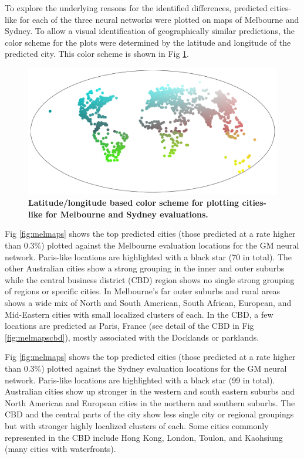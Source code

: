 \documentclass[10pt,letterpaper]{article}
\begin{document}
To explore the underlying reasons for the identified differences, predicted cities-like for each of the three neural networks were plotted on maps of Melbourne and Sydney. To allow a visual identification of geographically similar predictions, the color scheme for the plots were determined by the latitude and longitude of the predicted city. This color scheme is shown in Fig \ref{fig:colorscheme}. 


\begin{figure}[!htbp]
\centering    
\includegraphics[scale=0.25]{Images/World_map_color_scheme.png} 
\caption{\bf Latitude/longitude based color scheme for plotting cities-like for Melbourne and Sydney evaluations.}    
 \label{fig:colorscheme}  
\end{figure} 


Fig \ref{fig:melmaps} shows the top predicted cities (those predicted at a rate higher than 0.3\%) plotted against the Melbourne evaluation locations for the GM neural network. Paris-like locations are highlighted with a black star (70 in total). The other Australian cities show a strong grouping in the inner and outer suburbs while the central business district (CBD) region shows no single strong grouping of regions or specific cities. In Melbourne's far outer suburbs and rural areas shows a wide mix of North and South American, South African, European, and Mid-Eastern cities with small localized clusters of each. In the CBD, a few locations are predicted as Paris, France (see detail of the CBD in Fig \ref{fig:melmapscbd}), mostly associated with the Docklands or parklands.

Fig \ref{fig:melmaps} shows the top predicted cities (those predicted at a rate higher than 0.3\%) plotted against the Sydney evaluation locations for the GM neural network. Paris-like locations are highlighted with a black star (99 in total).  Australian cities show up stronger in the western and south eastern suburbs and North American and European cities in the northern and southern suburbs. The CBD and the central parts of the city show less single city or regional groupings but with stronger highly localized clusters of each. Some cities commonly represented in the CBD include Hong Kong, London, Toulon, and Kaohsiung (many cities with waterfronts). 
\end{document}
